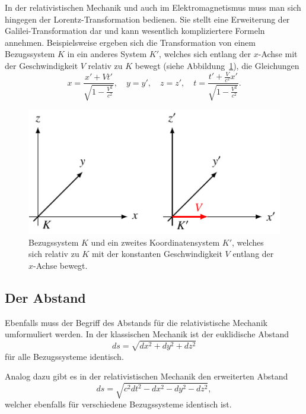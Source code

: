 In der relativistischen Mechanik und auch im Elektromagnetismus
muss man sich hingegen der Lorentz-Transformation bedienen.
Sie stellt eine Erweiterung der Galilei-Transformation dar
und kann wesentlich kompliziertere Formeln annehmen.
Beispielsweise ergeben sich die Transformation von einem
Bezugssystem \(K\) in ein anderes System \(K'\),
welches sich entlang der \(x\)-Achse mit der Geschwindigkeit \(V\)
relativ zu \(K\) bewegt (siehe Abbildung~\ref{relativ:fig:lorentz-trafo-koords}),
die Gleichungen
\begin{equation}
    x = \frac{x' + V t'}{\sqrt{1 - \frac{V^2}{c^2}}}, \quad
    y = y', \quad
    z = z', \quad
    t = \frac{t' + \frac{V}{c^2}x'}{\sqrt{1-\frac{V^2}{c^2}}}.
    \label{relativ:eqn:lorentz-trafo-beisp}
\end{equation}
\begin{figure}
    \centering
    \includegraphics{papers/relativ/tikz/lorentz-trafo-koord.pdf}
    \caption{Bezugssystem \(K\) und ein zweites Koordinatensystem \(K'\),
    welches sich relativ zu \(K\) mit der konstanten Geschwindigkeit \(V\)
    entlang der \(x\)-Achse bewegt.
    \label{relativ:fig:lorentz-trafo-koords}}
\end{figure}

\subsection{Der Abstand 
\label{relativ:section:abstand}}

Ebenfalls muss der Begriff des Abstands für die relativistische Mechanik umformuliert werden.
In der klassischen Mechanik ist der euklidische Abstand
\begin{equation}
    ds=\sqrt{dx^2 + dy^2 + dz^2}
    \label{relativ:eqn:abstand-klass}
\end{equation}
für alle Bezugssysteme identisch.

Analog dazu gibt es in der relativistischen Mechanik den erweiterten Abstand
\begin{equation}
    ds = \sqrt{c^2dt^2 - dx^2 - dy^2 - dz^2},
    \label{relativ:eqn:abstand-relativ}
\end{equation}
welcher ebenfalls für verschiedene Bezugssysteme identisch ist.


